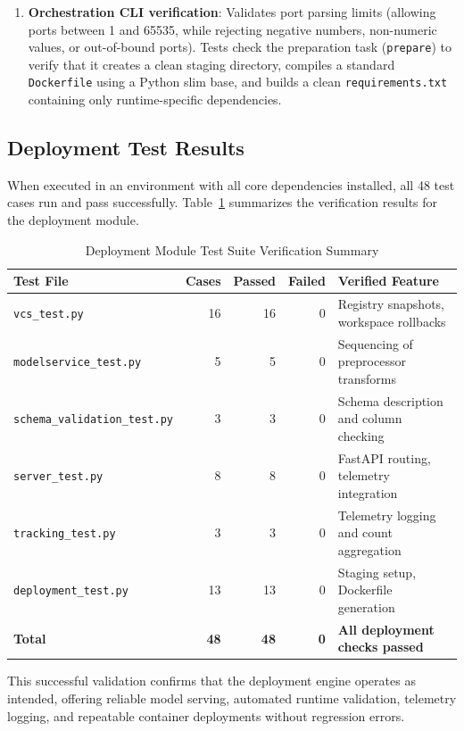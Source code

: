 \documentclass[12pt,a4paper,oneside]{report}
\begin{document}
\begin{enumerate}[leftmargin=*]
  \item \textbf{Orchestration CLI verification}:
    Validates port parsing limits (allowing ports between 1 and 65535, while rejecting negative numbers, non-numeric values, or out-of-bound ports). Tests check the preparation task (\texttt{prepare}) to verify that it creates a clean staging directory, compiles a standard \texttt{Dockerfile} using a Python slim base, and builds a clean \texttt{requirements.txt} containing only runtime-specific dependencies.
\end{enumerate}

\subsection{Deployment Test Results}
\noindent When executed in an environment with all core dependencies installed, all 48 test cases run and pass successfully. Table~\ref{tab:deployment-test-summary} summarizes the verification results for the deployment module.

\begin{table}[H]
\centering
\scriptsize
\caption{Deployment Module Test Suite Verification Summary}
\label{tab:deployment-test-summary}
\begin{tabularx}{\textwidth}{p{}rrrX}
\toprule
\textbf{Test File} & \textbf{Cases} & \textbf{Passed} & \textbf{Failed} & \textbf{Verified Feature} \\
\midrule
\texttt{vcs\_test.py} & 16 & 16 & 0 & Registry snapshots, workspace rollbacks \\
\texttt{modelservice\_test.py} & 5 & 5 & 0 & Sequencing of preprocessor transforms \\
\texttt{schema\_validation\_test.py} & 3 & 3 & 0 & Schema description and column checking \\
\texttt{server\_test.py} & 8 & 8 & 0 & FastAPI routing, telemetry integration \\
\texttt{tracking\_test.py} & 3 & 3 & 0 & Telemetry logging and count aggregation \\
\texttt{deployment\_test.py} & 13 & 13 & 0 & Staging setup, Dockerfile generation \\
\midrule
\textbf{Total} & \textbf{48} & \textbf{48} & \textbf{0} & \textbf{All deployment checks passed} \\
\bottomrule
\end{tabularx}
\end{table}

\noindent This successful validation confirms that the deployment engine operates as intended, offering reliable model serving, automated runtime validation, telemetry logging, and repeatable container deployments without regression errors.
\end{document}
